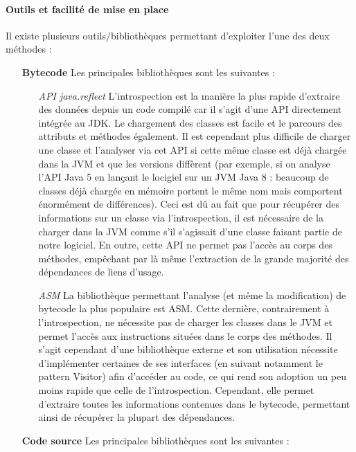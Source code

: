 \documentclass{scrartcl}
\begin{document}
    \paragraph{Outils et facilité de mise en place} Il existe plusieurs outils/bibliothèques permettant d'exploiter l'une des deux méthodes :
        \begin{itemize}
            \item[\textbf{Bytecode}] Les principales bibliothèques sont les suivantes :
            \begin{itemize}
                \item[\textit{API java.reflect}\footnotemark] L'introspection est la manière la plus rapide d'extraire des données depuis un code compilé car il s'agit d'une API directement intégrée au JDK. Le chargement des classes est facile et le parcours des attributs et méthodes également. Il est cependant plus difficile de charger une classe et l'analyser via cet API si cette même classe est déjà chargée dans la JVM et que les versions diffèrent (par exemple, si on analyse l'API Java 5 en lançant le locigiel sur un JVM Java 8 : beaucoup de classes déjà chargée en mémoire portent le même nom mais comportent énormément de différences). Ceci est dû au fait que pour récupérer des informations sur un classe via l'introspection, il est nécessaire de la charger dans la JVM comme s'il s'agissait d'une classe faisant partie de notre logiciel. En outre, cette API ne permet pas l'accès au corps des méthodes, empêchant par là même l'extraction de la grande majorité des dépendances de liens d'usage.
                \item[\textit{ASM}\footnotemark] La bibliothèque permettant l'analyse (et même la modification) de bytecode la plus populaire est ASM. Cette dernière, contrairement à l'introspection, ne nécessite pas de charger les classes dans le JVM et permet l'accès aux instructions situées dans le corps des méthodes. Il s'agit cependant d'une bibliothèque externe et son utilisation nécessite d'implémenter certaines de ses interfaces (en suivant notamment le pattern Visitor) afin d'accéder au code, ce qui rend son adoption un peu moins rapide que celle de l'introspection. Cependant, elle permet d'extraire toutes les informations contenues dans le bytecode, permettant ainsi de récupérer la plupart des dépendances.
            \end{itemize}
            \item[\textbf{Code source}] Les principales bibliothèques sont les suivantes :

\end{itemize}
\end{document}
